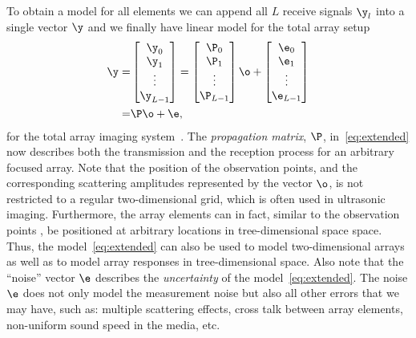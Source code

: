 To obtain a model for all elements we can append all $L$ receive signals $\y_l$ into a single vector $\y$ and
we finally have linear model for the total array setup
\begin{equation}
  \begin{split}
    \y = & \begin{bmatrix} \y_{0} \\
      \y_1 \\  \vdots \\
      \y_{L-1}\\  \end{bmatrix}  = \begin{bmatrix} \P_{0} \\
      \P_1 \\  \vdots \\
      \P_{L-1}\\  \end{bmatrix}
    \o +
    \begin{bmatrix} \e_0 \\ \e_1 \\  \vdots \\ \e_{L-1} \\ \end{bmatrix} \\
    = & \P \o + \e,
  \end{split}
  \label{eq:extended}
\end{equation}
for the total array imaging system~\cite{Lingvall2004}.
%
The \emph{propagation matrix}, $\P$, in~\eqref{eq:extended} now
describes both the transmission and the reception process for an arbitrary focused
array. Note that the position of the observation points, and the corresponding scattering amplitudes represented
by the vector $\o$, is not restricted to a regular two-dimensional grid, which is often used in ultrasonic imaging.
%
Furthermore, the array elements can in fact, similar to the observation points , be positioned at arbitrary locations in
tree-dimensional space space. Thus, the model~\eqref{eq:extended} can also
be used to model two-dimensional arrays as well as to model array responses in tree-dimensional space.
Also note that the ``noise'' vector $\e$ describes the \emph{uncertainty} of the model~\eqref{eq:extended}. The noise $\e$
does not only model the measurement noise but also all other errors that we may have, such as: multiple scattering effects,
cross talk between array elements, non-uniform sound speed in the media, etc.


